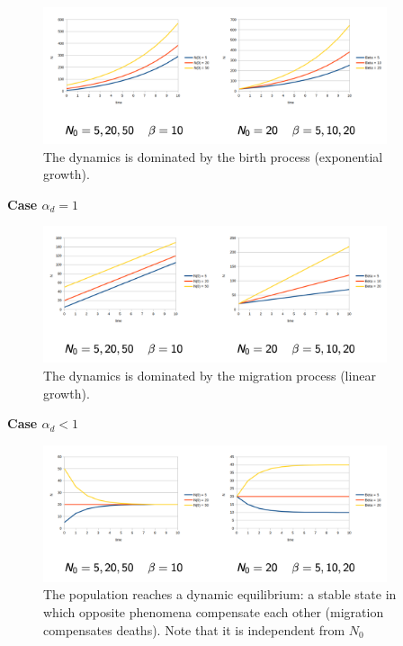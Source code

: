\begin{figure}[h]
    \centering
    \includegraphics[width=0.9\textwidth]{Images/02-Discrete Dynamical Systems/case_1.png}
    \caption{The dynamics is dominated by the birth process (exponential growth).} 
\end{figure}

\par \textbf{Case $\alpha_{d} = 1$}

\begin{figure}[h]
    \centering
    \includegraphics[width=0.9\textwidth]{Images/02-Discrete Dynamical Systems/case_2.png}
    \caption{The dynamics is dominated by the migration process (linear growth).} 
\end{figure}

\par \textbf{Case $\alpha_{d} < 1$}

\begin{figure}[h]
    \centering
    \includegraphics[width=0.9\textwidth]{Images/02-Discrete Dynamical Systems/case_3.png}
    \caption{The population reaches a dynamic equilibrium: a stable state in which opposite phenomena compensate each other (migration compensates deaths). Note that it is independent from $N_{0}$} 
\end{figure}


